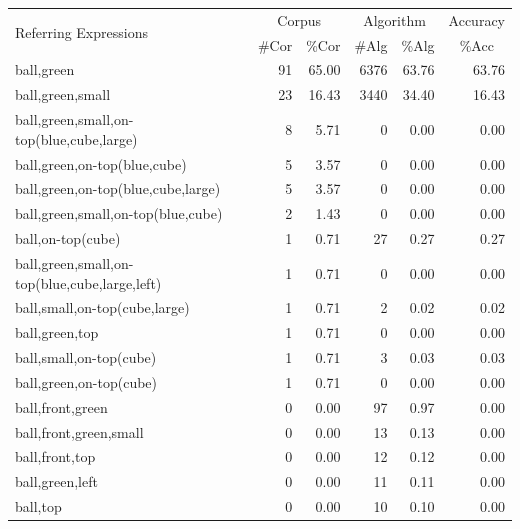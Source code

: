 \begin{table}[t]
\begin{small}
\begin{center}
\begin{tabular}{|l|r|r|r|r|r|}
\hline
\multirow{2}{*}{Referring Expressions} & \multicolumn{2}{|c|}{Corpus} & \multicolumn{2}{|c|}{Algorithm} & Accuracy \\ \cline{2-6} 
 & \#Cor & \multicolumn{1}{|c|}{\%Cor} & \multicolumn{1}{|c|}{\#Alg} & \multicolumn{1}{|c|}{\%Alg} & \multicolumn{1}{|c|}{\%Acc} \\
\hline
ball,green                                    & 91 & 65.00 & 6376 & 63.76 & 63.76 \\
ball,green,small                              & 23 & 16.43 & 3440 & 34.40 & 16.43 \\
ball,green,small,on-top(blue,cube,large)      &  8 &  5.71 &    0 &  0.00 &  0.00\\
ball,green,on-top(blue,cube)                  &  5 &  3.57 &    0 &  0.00 &  0.00\\
ball,green,on-top(blue,cube,large)            &  5 &  3.57 &    0 &  0.00 &  0.00\\
ball,green,small,on-top(blue,cube)            &  2 &  1.43 &    0 &  0.00 &  0.00\\
ball,on-top(cube)                             &  1 &  0.71 &   27 &  0.27 &  0.27 \\
ball,green,small,on-top(blue,cube,large,left) &  1 &  0.71 &    0 &  0.00 &  0.00\\
ball,small,on-top(cube,large)	              &  1 &  0.71 &    2 &  0.02 &  0.02 \\
ball,green,top                                &  1 &  0.71 &    0 &  0.00 &  0.00\\
ball,small,on-top(cube)                       &  1 &  0.71 &    3 &  0.03 &  0.03 \\
ball,green,on-top(cube)                       &  1 &  0.71 &    0 &  0.00 &  0.00\\
ball,front,green                              &  0 &  0.00 &   97 &  0.97 &  0.00\\
ball,front,green,small                        &  0 &  0.00 &   13 &  0.13 &  0.00\\
ball,front,top                                &  0 &  0.00 &   12 &  0.12 &  0.00\\
ball,green,left	                              &  0 &  0.00 &   11 &  0.11 &  0.00\\
ball,top                                      &  0 &  0.00 &   10 &  0.10 &  0.00\\

\end{tabular}
\end{center}
\end{small}
\end{table}
